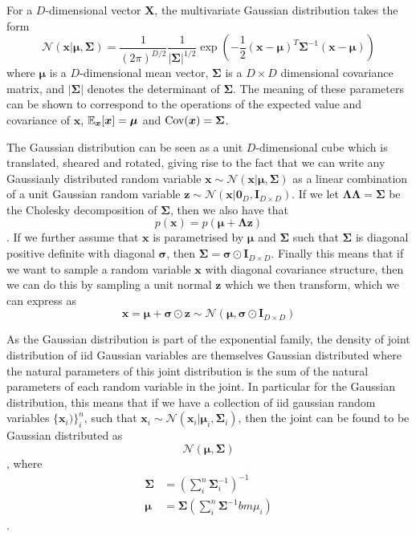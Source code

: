 For a $D$-dimensional vector $\bm{X}$, the multivariate Gaussian distribution
takes the form
\begin{equation}
  \label{eq:Gaussian_dist}
  \mathcal{N}(\bm{x} | \bm{\mu}, \bm{\Sigma}) = \frac{1}{(2\pi)^{D/2}}\frac{1}{|\bm{\Sigma}|^{1/2}}\exp\left( -\frac{1}{2}(\bm{x} - \bm{\mu})^T\bm{\Sigma}^{-1}(\bm{x} - \bm{\mu})\right)
\end{equation}
where $\bm{\mu}$ is a $D$-dimensional mean vector, $\bm{\Sigma}$ is a $D \times
D$ dimensional covariance matrix, and $|\bm{\Sigma}|$ denotes the determinant of
$\bm{\Sigma}$. The meaning of these parameters can be shown to correspond to the
operations of the expected value and covariance of $\bm{x}$,
$\operatorname{\mathbb{E}}_{\bm{x}}[\bm{x}] = \bm{\mu}$ and $\operatorname{\text{Cov}}(\bm{x}) = \bm{\Sigma}$.

The Gaussian distribution can be seen as a unit $D$-dimensional cube which is
translated, sheared and rotated, giving rise to the fact that we can write any
Gaussianly distributed random variable $\bm{x} \sim \mathcal{N}(\bm{x} |
\bm{\mu}, \bm{\Sigma})$ as a linear combination of a unit Gaussian random
variable $\bm{z} \sim \mathcal{N}(\bm{x} | \bm{0}_D, \bm{I}_{D \times D})$. If
we let $\bm{\Lambda} \bm{\Lambda} = \bm{\Sigma}$ be the Cholesky
decomposition\cite[p.~100-102]{Press:2007:NRE:1403886} of $\bm{\Sigma}$, then we
also have that
\begin{equation*}
  p(\bm{x}) = p(\bm{\mu} + \bm{\Lambda}\bm{z})
\end{equation*}
. If we further assume that $\bm{x}$ is parametrised by $\bm{\mu}$ and
$\bm{\Sigma}$ such that $\bm{\Sigma}$ is diagonal positive definite with
diagonal $\bm{\sigma}$, then $\bm{\Sigma} = \bm{\sigma} \odot \bm{I}_{D \times
  D}$. Finally this means that if we want to sample a random variable $\bm{x}$
with diagonal covariance structure, then we can do this by sampling a unit
normal $\bm{z}$ which we then transform, which we can express as
\begin{equation}
  \label{eq:sample_x}
  \bm{x} = \bm{\mu} + \bm{\sigma} \odot \bm{z} \sim \mathcal{N}(\bm{\mu}, \bm{\sigma} \odot \bm{I}_{D \times D})
\end{equation}\cite[p.~78-84]{Bishop:2006}

As the Gaussian distribution is part of the exponential family, the density of
joint distribution of iid Gaussian variables are themselves Gaussian distributed
where the natural parameters of this joint distribution is the sum of the
natural parameters of each random variable in the joint. In particular for the
Gaussian distribution, this means that if we have a collection of iid gaussian
random variables $\{\bm{x}_i)\}_i^n$, such that $\bm{x}_i \sim
\mathcal{N}(\bm{x}_i | \bm{\mu}_i, \bm{\Sigma}_{i})$, then the joint
can be found to be Gaussian distributed as
\begin{equation}
  \label{eq:join_dist_Gaussian}
  \mathcal{N}(\bm{\mu}, \bm{\Sigma})
\end{equation},
where
\begin{align*}
  \bm{\Sigma} & = \left( \sum_i^n \bm{\Sigma}_i^{-1} \right)^{-1}\\ 
  \bm{\mu} & = \bm{\Sigma}\left( \sum_i^n \bm{\Sigma}^{-1} bm{\mu}_i \right)
\end{align*}.

